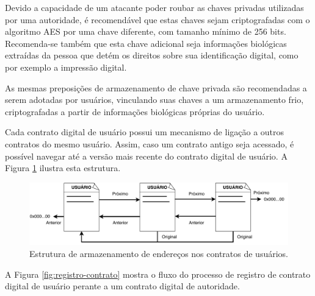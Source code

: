 \documentclass[tcc,capa]{texufpel}
\begin{document}
        Devido a capacidade de um atacante poder roubar as chaves privadas utilizadas por uma autoridade, é recomendável que estas chaves sejam criptografadas com o algoritmo AES por uma chave diferente, com tamanho mínimo de 256 bits. Recomenda-se também que esta chave adicional seja informações biológicas extraídas da pessoa que detém os direitos sobre sua identificação digital, como por exemplo a impressão digital.
        
        As mesmas preposições de armazenamento de chave privada são recomendadas a serem adotadas por usuários, vinculando suas chaves a um armazenamento frio, criptografadas a partir de informações biológicas próprias do usuário.
        
        Cada contrato digital de usuário possui um mecanismo de ligação a outros contratos do mesmo usuário. Assim, caso um contrato antigo seja acessado, é possível navegar até a versão mais recente do contrato digital de usuário. A Figura \ref{fig:estrutura-enderecamento-contratos-usuario} ilustra esta estrutura.
        
        \begin{figure}[h]
            \centering
            \includegraphics[width=15cm]{imagens/estrutura-enderecos-usuario.pdf}
            \caption{Estrutura de armazenamento de endereços nos contratos de usuários.}
            \label{fig:estrutura-enderecamento-contratos-usuario}
        \end{figure}
        
        A Figura \ref{fig:registro-contrato} mostra o fluxo do processo de registro de contrato digital de usuário perante a um contrato digital de autoridade.
        
\end{document}
